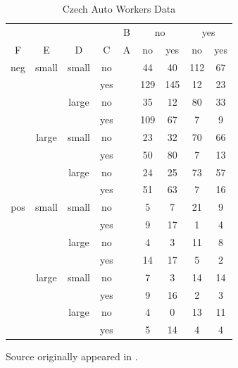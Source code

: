 \documentclass[a4paper]{article}
\begin{document}
\begin{appendix}
\begin{table}[H]
\begin{center}
  \begin{tabular}{cccc|ccccc} \hline
    &       &       &     &B &  \multicolumn{2}{c}{no} & \multicolumn{2}{c}{yes} \\
F   &  E    &  D    & C   &A &  no & yes & no  & yes \\ \hline
neg & small & small & no  &  &  44 &  40 & 112 &  67 \\
    &       &       & yes &  & 129 & 145 &  12 &  23 \\
    &       & large & no  &  &  35 &  12 &  80 &  33 \\
    &       &       & yes &  & 109 &  67 &   7 &   9 \\
    & large & small & no  &  &  23 &  32 &  70 &  66 \\
    &       &       & yes &  &  50 &  80 &   7 &  13 \\
    &       & large & no  &  &  24 &  25 &  73 &  57 \\
    &       &       & yes &  &  51 &  63 &   7 &  16 \\
pos & small & small & no  &  &   5 &   7 &  21 &   9 \\
    &       &       & yes &  &   9 &  17 &   1 &   4 \\
    &       & large & no  &  &   4 &   3 &  11 &   8 \\
    &       &       & yes &  &  14 &  17 &   5 &   2 \\
    & large & small & no  &  &   7 &   3 &  14 &  14 \\
    &       &       & yes &  &   9 &  16 &   2 &   3 \\
    &       & large & no  &  &   4 &   0 &  13 &  11 \\
    &       &       & yes &  &   5 &  14 &   4 &   4 \\ \hline
  \end{tabular}             
  \caption{Czech Auto Workers Data}
\end{center}
  Source \cite{dobra} originally appeared in \cite{edwards}.
  \label{tab:czech}
\end{table}
 

\end{appendix}
\end{document}
